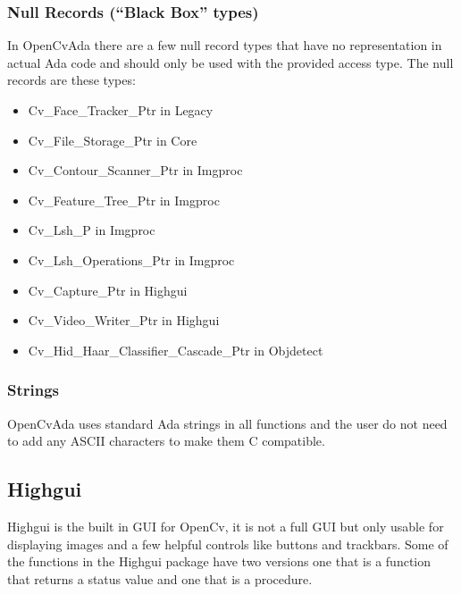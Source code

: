 \subsubsection{Null Records (``Black Box'' types)}
In OpenCvAda there are a few null record types that have no representation in actual Ada code and should only be used with the provided access type. The null records are these types:
\begin{itemize}
\item Cv_Face_Tracker_Ptr in Legacy
\item Cv_File_Storage_Ptr in Core
\item Cv_Contour_Scanner_Ptr in Imgproc
\item Cv_Feature_Tree_Ptr in Imgproc
\item Cv_Lsh_P in Imgproc
\item Cv_Lsh_Operations_Ptr in Imgproc
\item Cv_Capture_Ptr in Highgui
\item Cv_Video_Writer_Ptr in Highgui
\item Cv_Hid_Haar_Classifier_Cascade_Ptr in Objdetect
\end{itemize}
\subsubsection{Strings}
OpenCvAda uses standard Ada strings in all functions and the user do not need to add any ASCII characters to make them C compatible.
\subsection{Highgui}
Highgui is the built in GUI for OpenCv, it is not a full GUI but only usable for displaying images and a few helpful controls like buttons and trackbars. Some of the functions in the Highgui package have two versions one that is a function that returns a status value and one that is a procedure.
